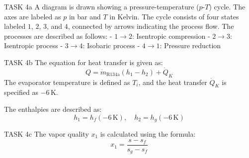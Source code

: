 TASK 4a  
A diagram is drawn showing a pressure-temperature (\( p \)-\( T \)) cycle. The axes are labeled as \( p \) in bar and \( T \) in Kelvin. The cycle consists of four states labeled \( 1 \), \( 2 \), \( 3 \), and \( 4 \), connected by arrows indicating the process flow. The processes are described as follows:  
- \( 1 \to 2 \): Isentropic compression  
- \( 2 \to 3 \): Isentropic process  
- \( 3 \to 4 \): Isobaric process  
- \( 4 \to 1 \): Pressure reduction  

TASK 4b  
The equation for heat transfer is given as:  
\[
Q = \dot{m}_{\text{R134a}} (h_1 - h_2) + \dot{Q}_K
\]  
The evaporator temperature is defined as \( T_i \), and the heat transfer \( \dot{Q}_K \) is specified as \( -6 \, \text{K} \).  

The enthalpies are described as:  
\[
h_1 = h_f(-6 \, \text{K}), \quad h_2 = h_g(-6 \, \text{K})
\]  

TASK 4c  
The vapor quality \( x_1 \) is calculated using the formula:  
\[
x_1 = \frac{s - s_f}{s_g - s_f}
\]
